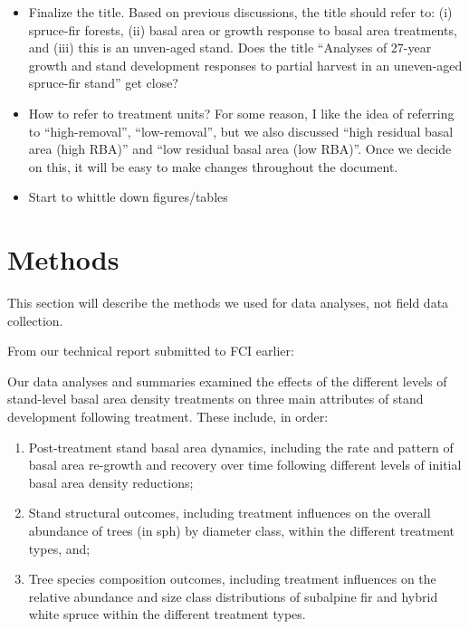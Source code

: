 \documentclass[
]{article}
\providecommand{\tightlist}{%
  \setlength{\itemsep}{0pt}\setlength{\parskip}{0pt}}
\begin{document}
\begin{itemize}
\tightlist
\item
  Finalize the title. Based on previous discussions, the title should refer to: (i) spruce-fir forests, (ii) basal area or growth response to basal area treatments, and (iii) this is an unven-aged stand. Does the title ``Analyses of 27-year growth and stand development responses to partial harvest in an uneven-aged spruce-fir stand'' get close?
\item
  How to refer to treatment units? For some reason, I like the idea of referring to ``high-removal'', ``low-removal'', but we also discussed ``high residual basal area (high RBA)'' and ``low residual basal area (low RBA)''. Once we decide on this, it will be easy to make changes throughout the document.
\item
  Start to whittle down figures/tables
\end{itemize}

\hypertarget{methods}{%
\section{Methods}\label{methods}}

This section will describe the methods we used for data analyses, not field data collection.

From our technical report submitted to FCI earlier:

Our data analyses and summaries examined the effects of the different levels of stand-level basal area density treatments on three main attributes of stand development following treatment. These include, in order:

\begin{enumerate}
\def\labelenumi{\arabic{enumi}.}
\tightlist
\item
  Post-treatment stand basal area dynamics, including the rate and pattern of basal area re-growth and recovery over time following different levels of initial basal area density reductions;
\item
  Stand structural outcomes, including treatment influences on the overall abundance of trees (in sph) by diameter class, within the different treatment types, and;
\item
  Tree species composition outcomes, including treatment influences on the relative abundance and size class distributions of subalpine fir and hybrid white spruce within the different treatment types.
\end{enumerate}
\end{document}
